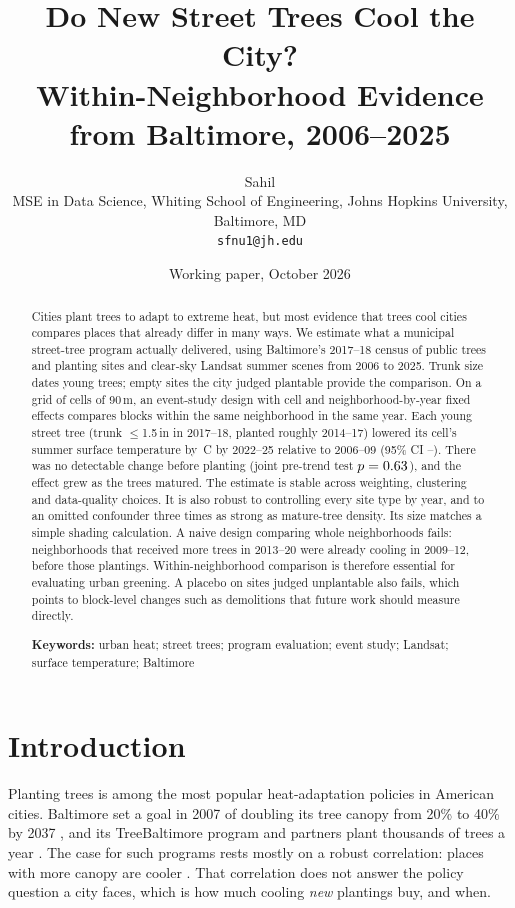 \documentclass[11pt]{article}
\title{\textbf{Do New Street Trees Cool the City?\\ Within-Neighborhood Evidence from Baltimore, 2006--2025}}
\author{Sahil\\[2pt]\small MSE in Data Science, Whiting School of Engineering, Johns Hopkins University, Baltimore, MD\\\small \texttt{sfnu1@jh.edu}}
\date{Working paper, October 2026}
\newcommand{\degC}{\,\textdegree C}
\begin{document}
\maketitle

\begin{abstract}
\noindent Cities plant trees to adapt to extreme heat, but most evidence that trees cool cities compares places that already differ in many ways. We estimate what a municipal street-tree program actually delivered, using Baltimore's 2017--18 census of \NInventory{} public trees and planting sites and \NScenesUsed{} clear-sky Landsat summer scenes from 2006 to 2025. Trunk size dates young trees; empty sites the city judged plantable provide the comparison. On a grid of \NCells{} cells of 90\,m, an event-study design with cell and neighborhood-by-year fixed effects compares blocks within the same neighborhood in the same year. Each young street tree (trunk $\le$1.5\,in in 2017--18, planted roughly 2014--17) lowered its cell's summer surface temperature by \EstAabs\degC{} by 2022--25 relative to 2006--09 (95\% CI \LoAabs--\HiAabs). There was no detectable change before planting (joint pre-trend test $p=0.63$), and the effect grew as the trees matured. The estimate is stable across weighting, clustering and data-quality choices. It is also robust to controlling every site type by year, and to an omitted confounder three times as strong as mature-tree density. Its size matches a simple shading calculation. A naive design comparing whole neighborhoods fails: neighborhoods that received more trees in 2013--20 were already cooling in 2009--12, before those plantings. Within-neighborhood comparison is therefore essential for evaluating urban greening. A placebo on sites judged unplantable also fails, which points to block-level changes such as demolitions that future work should measure directly.

\medskip\noindent\textbf{Keywords:} urban heat; street trees; program evaluation; event study; Landsat; surface temperature; Baltimore
\end{abstract}

\section{Introduction}

Planting trees is among the most popular heat-adaptation policies in American cities. Baltimore set a goal in 2007 of doubling its tree canopy from 20\% to 40\% by 2037 \citep{treebaltimore2018}, and its TreeBaltimore program and partners plant thousands of trees a year \citep{bnia}. The case for such programs rests mostly on a robust correlation: places with more canopy are cooler \citep{ziter2019}. That correlation does not answer the policy question a city faces, which is how much cooling \emph{new} plantings buy, and when.
\end{document}
